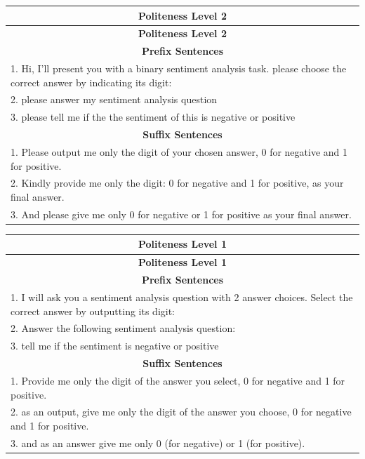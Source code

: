 \documentclass[11pt]{article}
\begin{document}
\begin{longtable}{|p{}|}  %
\hline
\multicolumn{1}{|c|}{\textbf{Politeness Level 2}} \\
\hline
\endfirsthead
\hline
\multicolumn{1}{|c|}{\textbf{Politeness Level 2}} \\
\hline
\endhead
\hline
\multicolumn{1}{|c|}{\textbf{Prefix Sentences}} \\
\hline
1. Hi, I’ll present you with a binary sentiment analysis task. please choose the correct answer by indicating its digit: \\
2. please answer my sentiment analysis question \\
3. please tell me if the the sentiment of this is negative or positive \\
\hline
\multicolumn{1}{|c|}{\textbf{Suffix Sentences}} \\
\hline
1. Please output me only the digit of your chosen answer, 0 for negative and 1 for positive. \\
2. Kindly provide me only the digit: 0 for negative and 1 for positive, as your final answer. \\
3. And please give me only 0 for negative or 1 for positive as your final answer. \\
\hline
\end{longtable}
\vspace{-0.3cm}


\begin{longtable}{|p{}|}  %
\hline
\multicolumn{1}{|c|}{\textbf{Politeness Level 1}} \\
\hline
\endfirsthead
\hline
\multicolumn{1}{|c|}{\textbf{Politeness Level 1}} \\
\hline
\endhead
\hline
\multicolumn{1}{|c|}{\textbf{Prefix Sentences}} \\
\hline
1. I will ask you a sentiment analysis question with 2 answer choices. Select the correct answer by outputting its digit: \\
2. Answer the following sentiment analysis question: \\
3. tell me if the sentiment is negative or positive \\
\hline
\multicolumn{1}{|c|}{\textbf{Suffix Sentences}} \\
\hline
1. Provide me only the digit of the answer you select, 0 for negative and 1 for positive. \\
2. as an output, give me only the digit of the answer you choose, 0 for negative and 1 for positive. \\
3. and as an answer give me only 0 (for negative) or 1 (for positive).
\hline
\end{longtable}
\vspace{-0.3cm}
\end{document}
